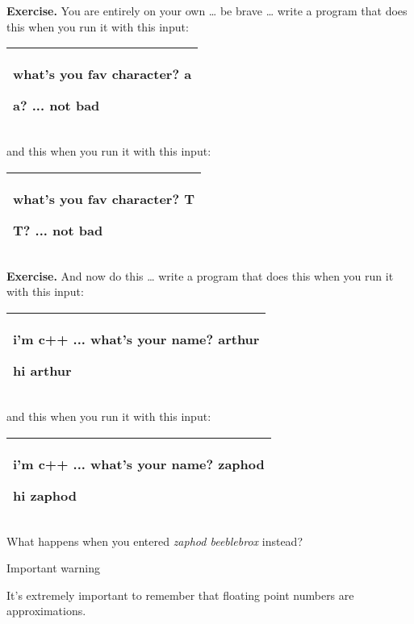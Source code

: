 \documentclass[
]{article}
\begin{document}
\textbf{Exercise.} You are entirely on your own \ldots{} be brave
\ldots{} write a program that does this when you run it with this input:

\begin{longtable}[]{@{}l@{}}
\toprule
\endhead
\begin{minipage}[t]{0.97\columnwidth}\raggedright
what's you fav character? \textbf{a}

a? ... not bad\strut
\end{minipage}\tabularnewline
\bottomrule
\end{longtable}

and this when you run it with this input:

\begin{longtable}[]{@{}l@{}}
\toprule
\endhead
\begin{minipage}[t]{0.97\columnwidth}\raggedright
what's you fav character? \textbf{T}

T? ... not bad\strut
\end{minipage}\tabularnewline
\bottomrule
\end{longtable}

\textbf{Exercise.} And now do this \ldots{} write a program that does
this when you run it with this input:

\begin{longtable}[]{@{}l@{}}
\toprule
\endhead
\begin{minipage}[t]{0.97\columnwidth}\raggedright
i'm c++ ... what's your name? \textbf{arthur}

hi arthur\strut
\end{minipage}\tabularnewline
\bottomrule
\end{longtable}

and this when you run it with this input:

\begin{longtable}[]{@{}l@{}}
\toprule
\endhead
\begin{minipage}[t]{0.97\columnwidth}\raggedright
i'm c++ ... what's your name? \textbf{zaphod}

hi zaphod\strut
\end{minipage}\tabularnewline
\bottomrule
\end{longtable}

What happens when you entered \emph{zaphod beeblebrox} instead?

Important warning

It's extremely important to remember that floating point numbers are
approximations.
\end{document}
